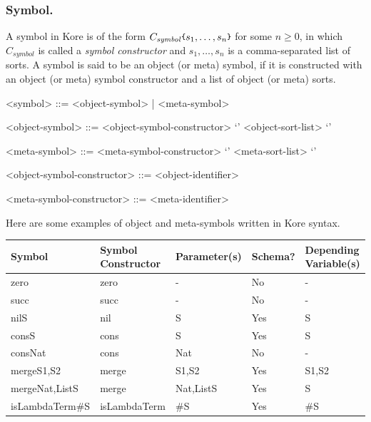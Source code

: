 \documentclass[UTF8,11pt]{article}
\theoremstyle{plain}
\theoremstyle{definition}
\theoremstyle{remark}
\newcommand{\parametric}[2]{{#1}\raisebox{.2ex}{\texttt{\footnotesize{\{}}}#2\raisebox{.2ex}{\texttt{\footnotesize{\}}}}}
\newcommand{\sharpsymbol}{\#}
\newcommand{\itsymbol}{\mathit{symbol}}
\begin{document}
\subsubsection{Symbol.}
A symbol in Kore is of the form $\parametric{C_\itsymbol}{s_1,\dots,s_n}$ for 
some $n \ge 0$, in which $C_\itsymbol$ is called a \emph{symbol constructor} 
and $s_1,\dots,s_n$ is a comma-separated list of sorts.
A symbol is said to be an object (or meta) symbol, if it is constructed with an 
object (or meta) symbol constructor and a list of object (or meta) sorts.
\begin{grammar}\small
	<symbol> ::= <object-symbol> | <meta-symbol>
	
	<object-symbol> ::= <object-symbol-constructor> `{' <object-sort-list> `}'
	
	<meta-symbol> ::= <meta-symbol-constructor> `{' <meta-sort-list> `}'
	
	<object-symbol-constructor> ::= <object-identifier>
	
	<meta-symbol-constructor> ::= <meta-identifier>
\end{grammar}

Here are some examples of object and meta-symbols written in Kore syntax.

\begin{center}{\ttfamily
		\begin{tabular}{lllll}
			\textrm{Symbol} & \textrm{Symbol Constructor} & 
			\textrm{Parameter(s)} & 
			\textrm{Schema?} & \textrm{Depending Variable(s)}
			\\\hline
			\parametric{zero}{} & zero & - & \textrm{No} & -
			\\\hline
			\parametric{succ}{} & succ & - & 
			\textrm{No} & -
			\\\hline
			\parametric{nil}{S} & nil & S			& 
			\textrm{Yes} & S
			\\\hline
			\parametric{cons}{S} & cons & 
			S 
			& \textrm{Yes} & S
			\\\hline
			\parametric{cons}{Nat} & cons & 
			Nat
			& \textrm{No} & -
			\\\hline
			\parametric{merge}{S1,S2} & merge & S1,S2 & \textrm{Yes} & S1,S2
			\\\hline
			\parametric{merge}{Nat,\parametric{List}{S}} & merge & 
			Nat,\parametric{List}{S} & 
			\textrm{Yes} & S
			\\\hline
			\parametric{isLambdaTerm}{\sharpsymbol S}
			& isLambdaTerm
			& \sharpsymbol S
			& \textrm{Yes}
			& \sharpsymbol S
		\end{tabular}
	}
\end{center}
\end{document}
